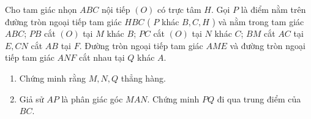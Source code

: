 \begin{ex}%
    Cho tam giác nhọn $ABC$ nội tiếp $(O)$ có trực tâm $H$. Gọi $P$ là điểm nằm trên đường tròn ngoại tiếp tam giác $HBC$ ( $P$ khác $B,C,H$ ) và nằm trong tam giác $ABC$; $PB$ cắt $(O)$ tại $M$ khác $B$; $PC$ cắt $(O)$ tại $N$ khác $C$; $BM$ cắt $AC$ tại $E, CN$ cắt $AB$ tại $F$. Đường tròn ngoại tiếp tam giác $AME$ và đường tròn ngoại tiếp tam giác $ANF$ cắt nhau tại $Q$ khác $A$. 
    \begin{enumerate}
        \item  Chứng minh rằng $M,N,Q$ thẳng hàng.
        \item Giả sử $AP$ là phân giác góc $MAN$. Chứng minh $PQ$ đi qua trung điểm của $BC$.
    \end{enumerate}
\loigiai
    {
    \begin{center}
\end{center}}
\end{ex}
